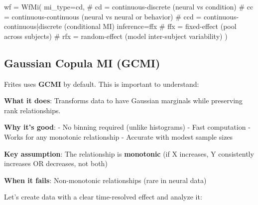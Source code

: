 \documentclass[
  11pt,
  letterpaper,
  oneside,
  openany]{book}
\newenvironment{Shaded}{\begin{snugshade}}{\end{snugshade}}
\newcommand{\CommentTok}[1]{\textcolor[rgb]{0.37,0.37,0.37}{#1}}
\newcommand{\NormalTok}[1]{\textcolor[rgb]{0.00,0.23,0.31}{#1}}
\newcommand{\OperatorTok}[1]{\textcolor[rgb]{0.37,0.37,0.37}{#1}}
\newcommand{\StringTok}[1]{\textcolor[rgb]{0.13,0.47,0.30}{#1}}
\begin{document}
\begin{Shaded}
\begin{Highlighting}[]
\NormalTok{wf }\OperatorTok{=}\NormalTok{ WfMi(}
\NormalTok{    mi\_type}\OperatorTok{=}\StringTok{\textquotesingle{}cd\textquotesingle{}}\NormalTok{,     }\CommentTok{\# \textquotesingle{}cd\textquotesingle{} = continuous{-}discrete (neural vs condition)}
                      \CommentTok{\# \textquotesingle{}cc\textquotesingle{} = continuous{-}continuous (neural vs neural or behavior)}
                      \CommentTok{\# \textquotesingle{}ccd\textquotesingle{} = continuous{-}continuous|discrete (conditional MI)}
\NormalTok{    inference}\OperatorTok{=}\StringTok{\textquotesingle{}ffx\textquotesingle{}}   \CommentTok{\# \textquotesingle{}ffx\textquotesingle{} = fixed{-}effect (pool across subjects)}
                      \CommentTok{\# \textquotesingle{}rfx\textquotesingle{} = random{-}effect (model inter{-}subject variability)}
\NormalTok{)}
\end{Highlighting}
\end{Shaded}

\subsection{Gaussian Copula MI (GCMI)}\label{gaussian-copula-mi-gcmi}

Frites uses \textbf{GCMI} by default. This is important to understand:

\textbf{What it does}: Transforms data to have Gaussian marginals while
preserving rank relationships.

\textbf{Why it's good}: - No binning required (unlike histograms) - Fast
computation - Works for any monotonic relationship - Accurate with
modest sample sizes

\textbf{Key assumption}: The relationship is \textbf{monotonic} (if X
increases, Y consistently increases OR decreases, not both)

\textbf{When it fails}: Non-monotonic relationships (rare in neural
data)

Let's create data with a clear time-resolved effect and analyze it:
\end{document}
